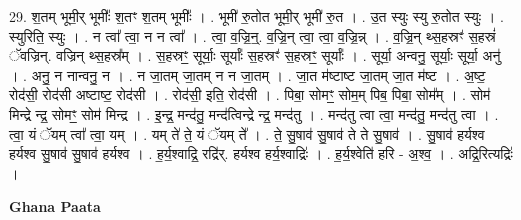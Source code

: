 \documentclass[17pt]{extarticle}
\begin{document}
29. श॒तम् भूमी॒र् भूमीः᳚ श॒तꣳ श॒तम् भूमीः᳚ । . भूमी॑ रु॒तोत भूमी॒र् भूमी॑ रु॒त । . उ॒त स्युः स्यु रु॒तोत स्युः । . स्युरिति॒ स्युः । . न त्वा᳚ त्वा॒ न न त्वा᳚ । . त्वा॒ व॒ज्रि॒न्॒. व॒ज्रि॒न् त्वा॒ त्वा॒ व॒ज्रि॒न्न् । . व॒ज्रि॒न् थ्स॒हस्रꣳ॑ स॒हस्रं॑ ॅवज्रिन्. वज्रिन् थ्स॒हस्र᳚म् । . स॒हस्रꣳ॒॒ सूर्याः॒ सूर्याः᳚ स॒हस्रꣳ॑ स॒हस्रꣳ॒॒ सूर्याः᳚ । . सूर्या॒ अन्वनु॒ सूर्याः॒ सूर्या॒ अनु॑ । . अनु॒ न नान्वनु॒ न । . न जा॒तम् जा॒तम् न न जा॒तम् । . जा॒त म॑ष्टाष्ट जा॒तम् जा॒त म॑ष्ट । . अ॒ष्ट॒ रोद॑सी॒ रोद॑सी अष्टाष्ट॒ रोद॑सी । . रोद॑सी॒ इति॒ रोद॑सी । . पिबा॒ सोमꣳ॒॒ सोम॒म् पिब॒ पिबा॒ सोम᳚म् । . सोम॑ मिन्द्रे न्द्र॒ सोमꣳ॒॒ सोम॑ मिन्द्र । . इ॒न्द्र॒ मन्द॑तु॒ मन्द॑त्विन्द्रे न्द्र॒ मन्द॑तु । . मन्द॑तु त्वा त्वा॒ मन्द॑तु॒ मन्द॑तु त्वा । . त्वा॒ यं ॅयम् त्वा᳚ त्वा॒ यम् । . यम् ते॑ ते॒ यं ॅयम् ते᳚ । . ते॒ सु॒षाव॑ सु॒षाव॑ ते ते सु॒षाव॑ । . सु॒षाव॑ हर्यश्व हर्यश्व सु॒षाव॑ सु॒षाव॑ हर्यश्व । . ह॒र्य॒श्वाद्रि॒ रद्रि॑र्. हर्यश्व हर्य॒श्वाद्रिः॑ । . ह॒र्य॒श्वेति॑ हरि - अ॒श्व॒ । . अद्रि॒रित्यद्रिः॑ । \newline

\textbf{Ghana Paata } \newline
\end{document}
